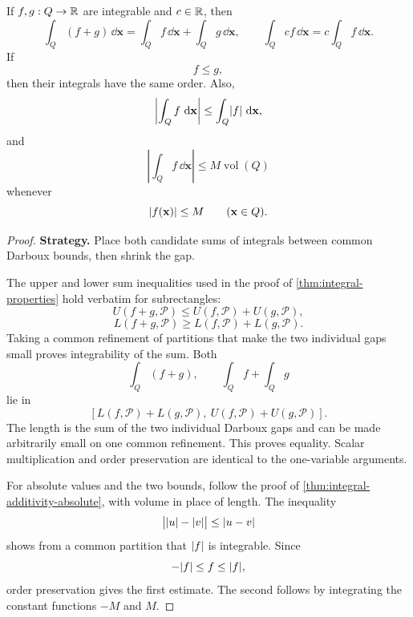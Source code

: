 \begin{theorem}
\label{thm:multivariable-integral-properties}
If $f,g:Q\to\mathbb{R}$ are integrable and $c\in\mathbb{R}$, then
\[
\int_Q(f+g)\,\dd\mathbf{x}
=\int_Qf\,\dd\mathbf{x}+\int_Qg\,\dd\mathbf{x},
\qquad
\int_Qcf\,\dd\mathbf{x}
=c\int_Qf\,\dd\mathbf{x}.
\]
If
\[
f\leq g,
\]
then their integrals have the same order.  Also,
\[
\left\lvert\int_Qf\,\mathop{}\!\mathrm{d}\mathbf{x}\right\rvert
\leq
\int_Q\lvert f\rvert\,\mathop{}\!\mathrm{d}\mathbf{x},
\]
and
\[
\left\lvert\int_Qf\,\dd\mathbf{x}\right\rvert
\leq M\operatorname{vol}(Q)
\]
whenever
\[
\lvert f(\mathbf{x})\rvert\leq M
\qquad(\mathbf{x}\in Q).
\]
\end{theorem}
\begin{proof}
\textbf{Strategy.} Place both candidate sums of integrals between common
Darboux bounds, then shrink the gap.

The upper and lower sum inequalities used in the proof of
\cref{thm:integral-properties} hold verbatim for subrectangles:
\[
U(f+g,\mathcal P)\leq U(f,\mathcal P)+U(g,\mathcal P),
\]
\[
L(f+g,\mathcal P)\geq L(f,\mathcal P)+L(g,\mathcal P).
\]
Taking a common refinement of partitions that make the two individual gaps
small proves integrability of the sum. Both
\[
\int_Q(f+g),\qquad \int_Qf+\int_Qg
\]
 lie in
\[
[L(f,\mathcal P)+L(g,\mathcal P),\ U(f,\mathcal P)+U(g,\mathcal P)].
\]
The length is the sum of the two individual Darboux gaps and can be made
arbitrarily small on one common refinement. This proves equality.
Scalar multiplication and order preservation are identical to
the one-variable arguments.

For absolute values and the two bounds, follow the proof of
\cref{thm:integral-additivity-absolute}, with volume in place of length.
The inequality
\[
\bigl\lvert\lvert u\rvert-\lvert v\rvert\bigr\rvert\leq\lvert u-v\rvert
\]
shows from a common partition that $\lvert f\rvert$ is integrable.  Since
\[
-\lvert f\rvert\leq f\leq\lvert f\rvert,
\]
order preservation gives the first estimate.  The second follows by
integrating the constant functions $-M$ and $M$.
\end{proof}




